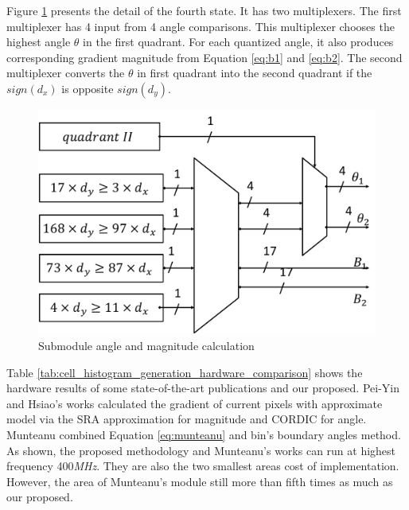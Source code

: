 Figure \ref{fig:angle_and_magnitude_calculation} presents the detail of the
fourth state.
It has two multiplexers.
The first multiplexer has 4 input from 4 angle comparisons.
This multiplexer chooses the highest angle $\theta$ in the first quadrant. 
For each quantized angle, it also produces corresponding gradient
magnitude from Equation \ref{eq:b1} and \ref{eq:b2}.
The second multiplexer converts the $\theta$ in first quadrant into the second
quadrant if the $sign(d_x)$ is opposite $sign(d_y)$.

\begin{figure}[h]
	\centering
	\def\sscale{.8\linewidth}
	\includegraphics[width=\sscale]{"imgs/angle_and_magnitude_calculation"}
	\caption{Submodule angle and magnitude calculation}
	\label{fig:angle_and_magnitude_calculation}
\end{figure}

Table \ref{tab:cell_histogram_generation_hardware_comparison} shows the hardware
results of some state-of-the-art publications and our proposed.
Pei-Yin and Hsiao's works calculated the gradient of  current pixels with
approximate model  via the SRA approximation for magnitude and CORDIC for angle.
Munteanu combined Equation \ref{eq:munteanu} and bin's boundary angles method.
As shown, the proposed methodology and Munteanu's works  can run at highest
frequency 400\textit{MHz}.
They are  also the two smallest areas cost of implementation.
However, the area of  Munteanu's module still more than   fifth times as much as
our proposed.


